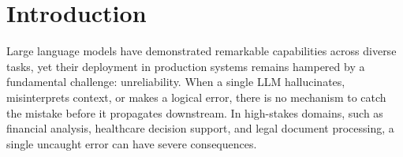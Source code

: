 \documentclass[sigconf]{acmart}
\newcommand{\reviewnote}[1]{}
\newcommand{\reviewnote}[1]{\marginnote{\raggedright\footnotesize\textit{#1}}}
\begin{document}


\maketitle


\section{Introduction}
\label{sec:intro}

Large language models have demonstrated remarkable capabilities across diverse tasks, yet their deployment in production systems remains hampered by a fundamental challenge: unreliability.\reviewnote{Strong opening. Consider citing recent production failures (e.g., chatbot hallucinations in customer service) to ground the problem.} When a single LLM hallucinates, misinterprets context, or makes a logical error, there is no mechanism to catch the mistake before it propagates downstream. In high-stakes domains, such as financial analysis, healthcare decision support, and legal document processing, a single uncaught error can have severe consequences.
\end{document}
